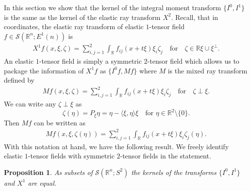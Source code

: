 \documentclass[11pt]{article}
\newcommand{\Rb}{\mathbb{R}}
\newcommand{\inner}[1]{\langle #1 \rangle}
\newcommand*{\Rt}{\mathbb{R}^2}
\newcommand{\sch}{\mathcal{S}}
\newtheorem{proposition}[theorem]{Proposition}
\newcommand{\qum}[1]{\quad\mbox{#1}}
\begin{document}
In this section we show that the kernel of the integral moment transform $\{I^0,I^1\}$ is the same as the kernel of the elastic ray transform $X^2$. Recall, that in coordinates, the elastic ray transform of elastic $1$-tensor field $f \in \sch(\mathbb{R}^n;E^1(n))$ is
\begin{align}
X^1 f(x, \xi, \zeta)
=  \sum_{i,j=1}^2 \int_{\mathbb{R}} f_{ij}(x + t \xi)\xi_i \zeta_j\quad\text{for}\quad\zeta \in \Rb \xi \cup \xi^{\perp}.
\end{align}
An elastic $1$-tensor field is simply a symmetric $2$-tensor field which allows us to package the information of $X^1f$ as $\{I^0f,Mf\}$ where $M$ is the mixed ray transform defined by
\begin{align}
    Mf(x, \xi, \zeta)=  \sum_{i,j=1}^2\int_{\mathbb{R}} f_{ij}(x + t \xi)\xi_i \zeta_j \quad\text{for}\quad \zeta\perp \xi.
\end{align}
We can write any $\zeta \perp \xi$ as
\begin{equation}
\zeta(\eta)
=
P_\xi\eta
=
\eta
-
\inner{\xi,\eta}\xi \qum{for $\eta\in\Rt\setminus\{0\}$.}
\end{equation}
Then $Mf$ can be written as
\begin{align}
Mf(x,\xi,\zeta(\eta))
= \sum_{i,j=1}^2 \int_{\mathbb{R}} f_{ij}(x + t \xi)\xi_i \zeta_j(\eta).
\end{align}
With this notation at hand, we have the following result. We freely identify elastic $1$-tensor fields with symmetric $2$-tensor fields in the statement.

\begin{proposition}
\label{prop_equi}
As subsets of $\sch(\mathbb{R}^n;S^2)$ the kernels of the transforms $\{I^0,I^1\}$ and $X^1$ are equal.
\end{proposition}
\end{document}
